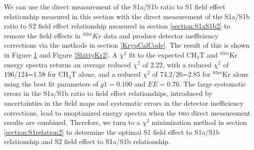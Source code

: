 We can use the direct measurement of the S1a/S1b ratio to S1 field effect relationship measured in this section with the direct measurement of the S1a/S1b ratio to S2 field effect relationship measured in section \ref{section:S1aS1b2} to remove the field effects in $^{83m}Kr$ data and produce detector inefficiency corrections via the methods in section \ref{KrypCalCode}.  The result of this is shown in Figure \ref{ShittyCH3T2} and Figure \ref{ShittyKr2}.  A $\chi^2$ fit to the expected CH$_3$T and $^{83m}$Kr energy spectra returns an average reduced $\chi^2$ of 2.22, with a reduced $\chi^2$ of 196/124=1.58 for CH$_3$T alone, and a reduced $\chi^2$ of 74.2/26=2.85 for $^{83m}$Kr alone using the best fit parameters of $g1=0.100$ and $EE=0.76$.  The large systematic errors in the S1a/S1b ratio to field effect relationships, introduced by uncertainties in the field maps and systematic errors in the detector inefficiency corrections, lead to unoptimized energy spectra when the two direct measurement results are combined.  Therefore, we turn to a $\chi^2$ minimization method in section \ref{section:S1relation2} to determine the optimal S1 field effect to S1a/S1b relationship and S2 field effect to S1a/S1b relationship.



\begin{figure} [!h]
\centering
{}
\qquad
{}
\label{ShittyCH3T2}
\end{figure}


